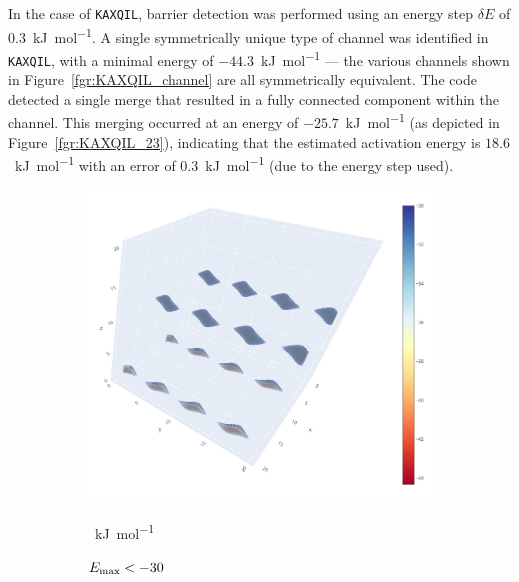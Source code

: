 \documentclass[main]{subfiles}
\begin{document}
In the case of \texttt{KAXQIL}, barrier detection was performed using an energy step $\delta E$ of \SI{0.3}{\kJ\per\mol}. A single symmetrically unique type of channel was identified in \texttt{KAXQIL}, with a minimal energy of $-44.3$~\si{\kJ\per\mole} --- the various channels shown in Figure~\ref{fgr:KAXQIL_channel} are all symmetrically equivalent. The code detected a single merge that resulted in a fully connected component within the channel. This merging occurred at an energy of $-25.7$~\si{\kJ\per\mole} (as depicted in Figure~\ref{fgr:KAXQIL_23}), indicating that the estimated activation energy is $18.6$~\si{\kJ\per\mole} with an error of \SI{0.3}{\kJ\per\mole} (due to the energy step used).

\begin{figure}[ht]
  \centering
  \begin{subfigure}[b]{0.32\textwidth}
    \centering
    \includegraphics[width=\textwidth]{figures/5-diffusion/KAXQIL_30.jpg}
    \caption{$E_{\text{max}}<-30$}~\si{\kJ\per\mole}\label{fgr:KAXQIL_30}
  \end{subfigure}
  \hfill
  \begin{subfigure}[b]{0.32\textwidth}
    \centering

\end{subfigure}
\end{figure}
\end{document}
